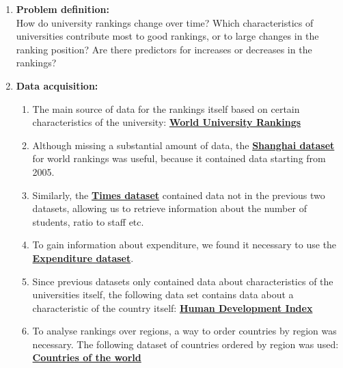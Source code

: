\documentclass{article}
\begin{document}
\begin{enumerate}[label=\textbf {\arabic*.}]
\item \textbf{Problem definition:} \\ 
How do university rankings change over time? Which characteristics of universities contribute most to good rankings, or to large changes in the ranking position? Are there predictors for increases or decreases in the rankings?

\item \textbf{Data acquisition:} \\
\begin{enumerate}[label=\textbf {\alph*)}]
\item The main source of data for the rankings itself based on certain characteristics of the university:
\hypertarget{World University Rankings}{} \href{https://www.kaggle.com/mylesoneill/world-university-rankings\#cwurData.csv}{\textbf{World University Rankings}}

\item Although missing a substantial amount of data, the \href{https://www.kaggle.com/mylesoneill/world-university-rankings\#shanghaiData.csv}{\textbf{Shanghai dataset}} for world rankings was useful, because it contained data starting from 2005.

\item Similarly, the \href{https://www.kaggle.com/mylesoneill/world-university-rankings\#timesData.csv}{\textbf{Times dataset}} contained data not in the previous two datasets, allowing us to retrieve information about the number of students, ratio to staff etc.

\item To gain information about expenditure, we found it necessary to use the \href{https://www.kaggle.com/mylesoneill/world-university-rankings\#education_expenditure_supplementary_data.csv}{\textbf{Expenditure dataset}}.

\item Since previous datasets only contained data about characteristics of the universities itself, the following data set contains data about a characteristic of the country itself: \href{https://www.kaggle.com/tjysdsg/human-development-index\#Human\%20Development\%20Index.csv}{\textbf{Human Development Index}}

\item To analyse rankings over regions, a way to order countries by region was necessary. The following dataset of countries ordered by region was used: \href{https://www.kaggle.com/fernandol/countries-of-the-world\#countries of the world.csv}{\textbf{Countries of the world}}


\end{enumerate}
\end{enumerate}
\end{document}
